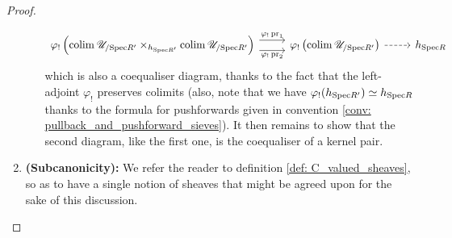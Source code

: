 \begin{proof}
\begin{enumerate}
\begin{enumerate}
$$\begin{tikzcd}
                                                	{\varphi_!\left(\colim \U_{/\Spec R'} \x_{h_{\Spec R'}} \colim \U_{/\Spec R'}\right)} & {\varphi_!\left(\colim \U_{/\Spec R'}\right)} & {h_{\Spec R}}
                                                	\arrow["\varphi_!\pr_2"', shift right=2, from=1-1, to=1-2]
                                                	\arrow["\varphi_!\pr_1", shift left=2, from=1-1, to=1-2]
                                                	\arrow[dashed, from=1-2, to=1-3]
                                                \end{tikzcd}
                                            $$
                                        which is also a coequaliser diagram, thanks to the fact that the left-adjoint $\varphi_!$ preserves colimits (also, note that we have $\varphi_!(h_{\mathrm{Spec} R'}) \simeq h_{\mathrm{Spec} R}$ thanks to the formula for pushforwards given in convention \ref{conv: pullback_and_pushforward_sieves}). It then remains to show that the second diagram, like the first one, is the coequaliser of a kernel pair.  
                                    \end{enumerate}
                                \item \textbf{(Subcanonicity):} We refer the reader to definition \ref{def: C_valued_sheaves}, so as to have a single notion of sheaves that might be agreed upon for the sake of this discussion.
                                

\end{enumerate}
\end{proof}
